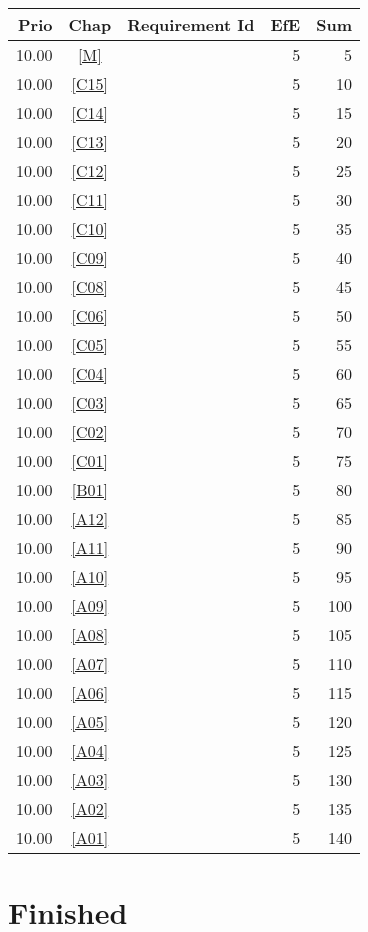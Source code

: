 \begin{longtable}{|r|c|p{7cm}||r|r|} \hline
\textbf{Prio} & \textbf{Chap} & \textbf{Requirement Id} & \textbf{EfE} & \textbf{Sum} \\ \hline\endhead
10.00 & \ref{M} & \nameref{M} & 5 & 5 \\ \hline
10.00 & \ref{C15} & \nameref{C15} & 5 & 10 \\ \hline
10.00 & \ref{C14} & \nameref{C14} & 5 & 15 \\ \hline
10.00 & \ref{C13} & \nameref{C13} & 5 & 20 \\ \hline
10.00 & \ref{C12} & \nameref{C12} & 5 & 25 \\ \hline
10.00 & \ref{C11} & \nameref{C11} & 5 & 30 \\ \hline
10.00 & \ref{C10} & \nameref{C10} & 5 & 35 \\ \hline
10.00 & \ref{C09} & \nameref{C09} & 5 & 40 \\ \hline
10.00 & \ref{C08} & \nameref{C08} & 5 & 45 \\ \hline
10.00 & \ref{C06} & \nameref{C06} & 5 & 50 \\ \hline
10.00 & \ref{C05} & \nameref{C05} & 5 & 55 \\ \hline
10.00 & \ref{C04} & \nameref{C04} & 5 & 60 \\ \hline
10.00 & \ref{C03} & \nameref{C03} & 5 & 65 \\ \hline
10.00 & \ref{C02} & \nameref{C02} & 5 & 70 \\ \hline
10.00 & \ref{C01} & \nameref{C01} & 5 & 75 \\ \hline
10.00 & \ref{B01} & \nameref{B01} & 5 & 80 \\ \hline
10.00 & \ref{A12} & \nameref{A12} & 5 & 85 \\ \hline
10.00 & \ref{A11} & \nameref{A11} & 5 & 90 \\ \hline
10.00 & \ref{A10} & \nameref{A10} & 5 & 95 \\ \hline
10.00 & \ref{A09} & \nameref{A09} & 5 & 100 \\ \hline
10.00 & \ref{A08} & \nameref{A08} & 5 & 105 \\ \hline
10.00 & \ref{A07} & \nameref{A07} & 5 & 110 \\ \hline
10.00 & \ref{A06} & \nameref{A06} & 5 & 115 \\ \hline
10.00 & \ref{A05} & \nameref{A05} & 5 & 120 \\ \hline
10.00 & \ref{A04} & \nameref{A04} & 5 & 125 \\ \hline
10.00 & \ref{A03} & \nameref{A03} & 5 & 130 \\ \hline
10.00 & \ref{A02} & \nameref{A02} & 5 & 135 \\ \hline
10.00 & \ref{A01} & \nameref{A01} & 5 & 140 \\ \hline
\end{longtable}\section{Finished}

